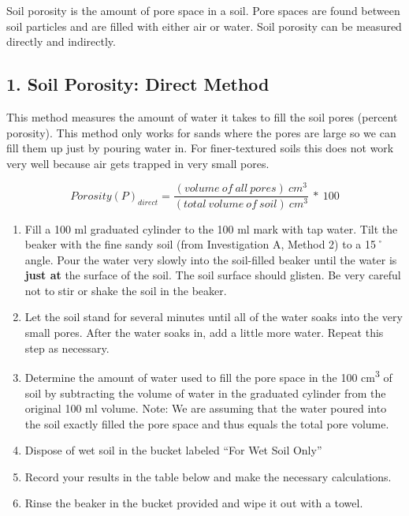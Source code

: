 \documentclass[
  letterpaper,
  twocolumn,
  portrait]{scrbook}
\providecommand{\tightlist}{%
  \setlength{\itemsep}{0pt}\setlength{\parskip}{0pt}}\usepackage{longtable,booktabs,array}
\begin{document}
Soil porosity is the amount of pore space in a soil. Pore spaces are
found between soil particles and are filled with either air or water.
Soil porosity can be measured directly and indirectly.

\hypertarget{soil-porosity-direct-method}{%
\subsection{1. Soil Porosity: Direct
Method}\label{soil-porosity-direct-method}}

This method measures the amount of water it takes to fill the soil pores
(percent porosity). This method only works for sands where the pores are
large so we can fill them up just by pouring water in. For
finer-textured soils this does not work very well because air gets
trapped in very small pores.

\[
Porosity(P)_{direct}=\frac{(volume\ of\ all\ pores)\ cm^{3}}{(total\ volume\ of\ soil)\ cm^{3}}\ *\ 100%
\]

\begin{enumerate}
\def\labelenumi{\arabic{enumi}.}
\tightlist
\item
  Fill a 100 ml graduated cylinder to the 100 ml mark with tap water.
  Tilt the beaker with the fine sandy soil (from Investigation A, Method
  2) to a 15˚ angle. Pour the water very slowly into the soil-filled
  beaker until the water is \textbf{just at} the surface of the soil.
  The soil surface should glisten. Be very careful not to stir or shake
  the soil in the beaker.
\item
  Let the soil stand for several minutes until all of the water soaks
  into the very small pores. After the water soaks in, add a little more
  water. Repeat this step as necessary.
\item
  Determine the amount of water used to fill the pore space in the 100
  cm\textsuperscript{3} of soil by subtracting the volume of water in
  the graduated cylinder from the original 100 ml volume. Note: We are
  assuming that the water poured into the soil exactly filled the pore
  space and thus equals the total pore volume.
\item
  Dispose of wet soil in the bucket labeled ``For Wet Soil Only''
\item
  Record your results in the table below and make the necessary
  calculations.
\item
  Rinse the beaker in the bucket provided and wipe it out with a towel.
\end{enumerate}
\end{document}
